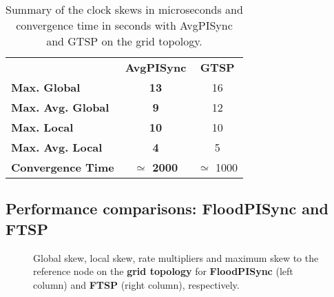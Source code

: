 \documentclass[english,a4paper,10pt,final]{article}
\numberwithin{equation}{section}
\numberwithin{figure}{section}
\begin{document}
\begin{table}

\center

\caption{ Summary of the clock skews in microseconds and convergence time in seconds with AvgPISync and GTSP on the grid topology. \label{table:pi-gtsp}}

\begin{tabular}{lcc}
 & \textbf{AvgPISync} & \textbf{GTSP} \\
\textbf{Max. Global}       	& {\bf 13}  & { 16} \\ 
\textbf{Max. Avg. Global }  & { \bf 9}  & { 12} \\ 
\textbf{Max. Local }        & { \bf 10}  & { 10} \\ 
\textbf{Max. Avg. Local }   & {\bf 4}   & { 5} \\ 
\textbf{Convergence Time }  & {\bf $\simeq$ 2000 }  & { $\simeq$ 1000}\\ 
\end{tabular}

\end{table}

\subsection{Performance comparisons: FloodPISync and FTSP}

\begin{figure*}
\center
{}


\caption{\label{fig:pi-ftsp-grid} Global skew, local skew, rate multipliers and maximum skew to the reference node on the \textbf{grid topology} for \textbf{FloodPISync} (left column) and \textbf{FTSP} (right column), respectively.}
\end{figure*}
\end{document}
